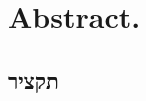 \documentclass[]{report}
\begin{document}

% 

% 





\chapter*{Abstract.}








\RPtrue
{}

% 

% 


\begin{hebrew}
\chapter*{\texthebrew{תקציר}}
\end{hebrew}

\newpage

\RPfalse
\end{document}
